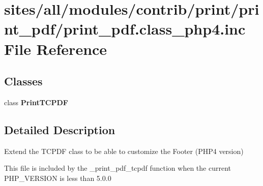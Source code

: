 \hypertarget{print__pdf_8class__php4_8inc}{
\section{sites/all/modules/contrib/print/print\_\-pdf/print\_\-pdf.class\_\-php4.inc File Reference}
\label{print__pdf_8class__php4_8inc}
}
\subsection*{Classes}
\begin{CompactItemize}
\item 
class \textbf{PrintTCPDF}
\end{CompactItemize}


\subsection{Detailed Description}
Extend the TCPDF class to be able to customize the Footer (PHP4 version)

This file is included by the \_\-print\_\-pdf\_\-tcpdf function when the current PHP\_\-VERSION is less than 5.0.0 